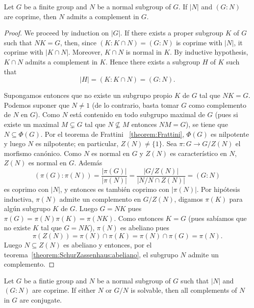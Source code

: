 \begin{theorem}
	\label{thm:SchurZassenhaus}
	Let $G$ be a finite group and $N$ be a normal subgroup of $G$. If 
	$|N|$ and $(G:N)$ are coprime, then $N$ admits a complement in $G$. 
\end{theorem}

\begin{proof}
	We proceed by induction on $|G|$. If there exists a proper subgroup $K$ of
	$G$ such that $NK=G$, then, since $(K:K\cap N)=(G:N)$ is coprime with $|N|$, it coprime with  
	$|K\cap N|$. Moreover, $K\cap N$ is normal in $K$. By inductive hypothesis, 
	$K\cap N$ admits a complement in $K$. Hence there exists a subgroup 
    $H$ of $K$ such that 
    \[
    |H|=(K:K\cap N)=(G:N).
    \] 
	
	Supongamos entonces que no existe un subgrupo propio $K$ de $G$ tal que
	$NK=G$.  Podemos suponer que $N\ne1$ (de lo contrario, basta tomar $G$ como
	complemento de $N$ en $G$).  Como $N$ está contenido en todo subgrupo
	maximal de $G$ (pues si existe un maximal $M\subsetneq G$ tal que
	$N\not\subseteq M$ entonces $NM=G$), se tiene que $N\subseteq\Phi(G)$. Por
	el teorema de Frattini ~\ref{theorem:Frattini}, $\Phi(G)$ es nilpotente y
	luego $N$ es nilpotente; en particular, $Z(N)\ne\{1\}$. Sea $\pi\colon G\to
	G/Z(N)$ el morfismo canónico. Como $N$ es normal en $G$ y $Z(N)$ es
	característico en $N$, $Z(N)$ es normal en $G$.  Además 
	\[
	(\pi(G):\pi(N))=\frac{|\pi(G)|}{|\pi(N)|}=\frac{|G/Z(N)|}{|N/N\cap Z(N)|}=(G:N)
	\]
	es coprimo con $|N|$, y entonces es también coprimo con $|\pi(N)|$. Por hipótesis
	inductiva, $\pi(N)$ admite un complemento en $G/Z(N)$, digamos $\pi(K)$
	para algún subgrupo $K$ de $G$. Luego $G=NK$ pues 
	$\pi(G)=\pi(N)\pi(K)=\pi(NK)$. 
	Como entonces $K=G$ (pues sabíamos que no existe $K$ tal que $G=NK$), 
	$\pi(N)$ es abeliano pues 
	\[
		\pi(Z(N))=\pi(N)\cap\pi(K)=\pi(N)\cap\pi(G)=\pi(N).
	\]
	Luego $N\subseteq Z(N)$ es abeliano y entonces, por el
	teorema~\ref{theorem:SchurZassenhaus:abeliano}, el subgrupo $N$ admite un
	complemento. 
\end{proof}

\begin{theorem}
	\label{them:SchurZassenhaus:conjugacion}
	Let $G$ be a fintie group and $N$ be a normal subgroup of $G$ such that $|N|$ and 
	$(G:N)$ are coprime. If either $N$ or $G/N$ is solvable, then all complements of $N$ in $G$ 
	are conjugate. 
\end{theorem}

